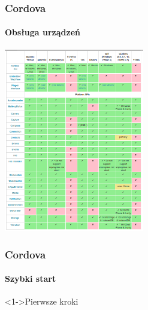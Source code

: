 \documentclass{beamer}
\begin{document}
\begin{frame}
\frametitle{Cordova}
\framesubtitle{Obsługa urządzeń}


      
    
          \includegraphics[height=8cm,valign=t]{supp_plat.png}

\end{frame}
\begin{frame}
\frametitle{Cordova}
\framesubtitle{Szybki start}
\begin{block}<1->{Pierwsze kroki}
    
\end{block}
\end{frame}
\end{document}
